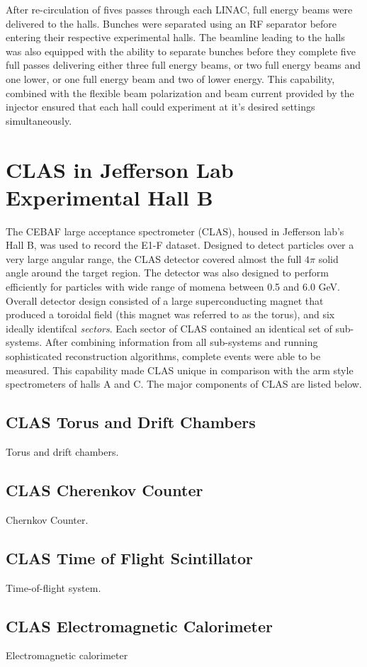 After re-circulation of fives passes through each LINAC, full energy beams were delivered to the halls.  Bunches were separated using an RF separator before entering their respective experimental halls.  The beamline leading to the halls was also equipped with the ability to separate bunches before they complete five full passes delivering either three full energy beams, or two full energy beams and one lower, or one full energy beam and two of lower energy.  This capability, combined with the flexible beam polarization and beam current provided by the injector ensured that each hall could experiment at it's desired settings simultaneously.  

\section{CLAS in Jefferson Lab Experimental Hall B}
The CEBAF large acceptance spectrometer (CLAS), housed in Jefferson lab's Hall B, was used to record the E1-F dataset.  Designed to detect particles over a very large angular range, the CLAS detector covered almost the full $4\pi$ solid angle around the target region.  The detector was also designed to perform efficiently for particles with wide range of momena between 0.5 and 6.0 GeV.  Overall detector design consisted of a large superconducting magnet that produced a toroidal field (this magnet was referred to as the torus), and six ideally identifcal \textit{sectors}.  Each sector of CLAS contained an identical set of sub-systems.  After combining information from all sub-systems and running sophisticated reconstruction algorithms, complete events were able to be measured.  This capability made CLAS unique in comparison with the arm style spectrometers of halls A and C.  The major components of CLAS are listed below.

\subsection{CLAS Torus and Drift Chambers}
Torus and drift chambers. 

\subsection{CLAS Cherenkov Counter}
Chernkov Counter.

\subsection{CLAS Time of Flight Scintillator}
Time-of-flight system.

\subsection{CLAS Electromagnetic Calorimeter}
Electromagnetic calorimeter

